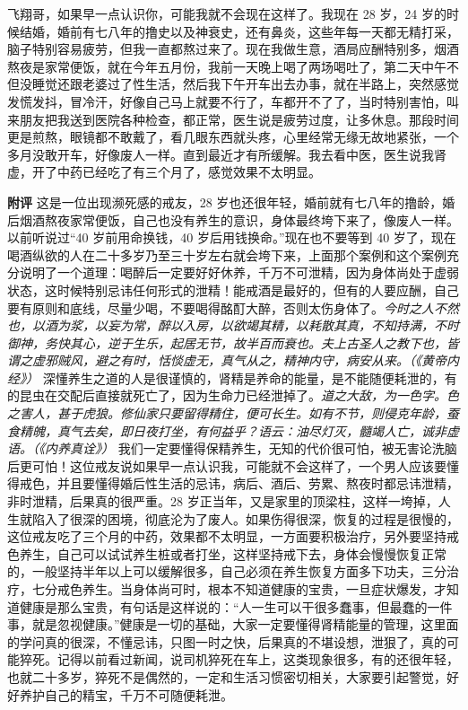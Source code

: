 \begin{case}
    飞翔哥，如果早一点认识你，可能我就不会现在这样了。我现在 28 岁，24 岁的时候结婚，婚前有七八年的撸史以及神衰史，还有鼻炎，这些年每一天都无精打采，脑子特别容易疲劳，但我一直都熬过来了。现在我做生意，酒局应酬特别多，烟酒熬夜是家常便饭，就在今年五月份，我前一天晚上喝了两场喝吐了，第二天中午不但没睡觉还跟老婆过了性生活，然后我下午开车出去办事，就在半路上，突然感觉发慌发抖，冒冷汗，好像自己马上就要不行了，车都开不了了，当时特别害怕，叫来朋友把我送到医院各种检查，都正常，医生说是疲劳过度，让多休息。那段时间更是煎熬，眼镜都不敢戴了，看几眼东西就头疼，心里经常无缘无故地紧张，一个多月没敢开车，好像废人一样。直到最近才有所缓解。我去看中医，医生说我肾虚，开了中药已经吃了有三个月了，感觉效果不太明显。

    \textbf{附评} 这是一位出现濒死感的戒友，28 岁也还很年轻，婚前就有七八年的撸龄，婚后烟酒熬夜家常便饭，自己也没有养生的意识，身体最终垮下来了，像废人一样。以前听说过“40 岁前用命换钱，40 岁后用钱换命。”现在也不要等到 40 岁了，现在喝酒纵欲的人在二十多岁乃至三十岁左右就会垮下来，上面那个案例和这个案例充分说明了一个道理：喝醉后一定要好好休养，千万不可泄精，因为身体尚处于虚弱状态，这时候特别忌讳任何形式的泄精！能戒酒是最好的，但有的人要应酬，自己要有原则和底线，尽量少喝，不要喝得酩酊大醉，否则太伤身体了。\textit{今时之人不然也，以酒为浆，以妄为常，醉以入房，以欲竭其精，以耗散其真，不知持满，不时御神，务快其心，逆于生乐，起居无节，故半百而衰也。夫上古圣人之教下也，皆谓之虚邪贼风，避之有时，恬惔虚无，真气从之，精神内守，病安从来。（《黄帝内经》）} 深懂养生之道的人是很谨慎的，肾精是养命的能量，是不能随便耗泄的，有的昆虫在交配后直接就死亡了，因为生命力已经泄掉了。\textit{道之大敌，为一色字。色之害人，甚于虎狼。修仙家只要留得精住，便可长生。如有不节，则侵克年龄，蚕食精魄，真气去矣，即日夜打坐，有何益乎？语云：油尽灯灭，髓竭人亡，诚非虚语。（《内养真诠》）} 我们一定要懂得保精养生，无知的代价很可怕，被无害论洗脑后更可怕！这位戒友说如果早一点认识我，可能就不会这样了，一个男人应该要懂得戒色，并且要懂得婚后性生活的忌讳，病后、酒后、劳累、熬夜时都忌讳泄精，非时泄精，后果真的很严重。28 岁正当年，又是家里的顶梁柱，这样一垮掉，人生就陷入了很深的困境，彻底沦为了废人。如果伤得很深，恢复的过程是很慢的，这位戒友吃了三个月的中药，效果都不太明显，一方面要积极治疗，另外要坚持戒色养生，自己可以试试养生桩或者打坐，这样坚持戒下去，身体会慢慢恢复正常的，一般坚持半年以上可以缓解很多，自己必须在养生恢复方面多下功夫，三分治疗，七分戒色养生。当身体尚可时，根本不知道健康的宝贵，一旦症状爆发，才知道健康是那么宝贵，有句话是这样说的：“人一生可以干很多蠢事，但最蠢的一件事，就是忽视健康。”健康是一切的基础，大家一定要懂得肾精能量的管理，这里面的学问真的很深，不懂忌讳，只图一时之快，后果真的不堪设想，泄狠了，真的可能猝死。记得以前看过新闻，说司机猝死在车上，这类现象很多，有的还很年轻，也就二十多岁，猝死不是偶然的，一定和生活习惯密切相关，大家要引起警觉，好好养护自己的精宝，千万不可随便耗泄。
\end{case}

